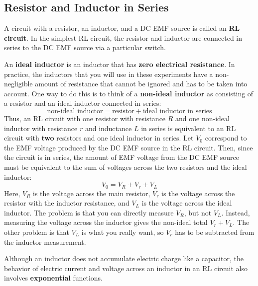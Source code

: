 \subsection{Resistor and Inductor in Series}
%
A circuit with a resistor, an inductor, and a DC EMF source is called an \textbf{RL circuit}. In the simplest RL circuit, the resistor and inductor are connected in series to the DC EMF source via a particular switch.

An \textbf{ideal inductor} is an inductor that has \textbf{zero electrical resistance}. In practice, the inductors that you will use in these experiments have a non-negligible amount of resistance that cannot be ignored and has to be taken into account. One way to do this is to think of a \textbf{non-ideal inductor} as consisting of a resistor and an ideal inductor connected in series:
\begin{equation}
    \text{non-ideal inductor} = \text{resistor} + \text{ideal inductor in series}
\end{equation}
Thus, an RL circuit with one resistor with resistance $R$ and one non-ideal inductor with resistance $r$ and inductance $L$ in series is equivalent to an RL circuit with \textbf{two} resistors and one ideal inductor in series. Let $V_{0}$ correspond to the EMF voltage produced by the DC EMF source in the RL circuit. Then, since the circuit is in series, the amount of EMF voltage from the DC EMF source must be equivalent to the sum of voltages across the two resistors and the ideal inductor:
\begin{equation}
    V_{0} = V_{R} + V_{r} + V_{L}
\end{equation}
Here, $V_{R}$ is the voltage across the main resistor, $V_{r}$ is the voltage across the resistor with the inductor resistance, and $V_{L}$ is the voltage across the ideal inductor. The problem is that you can directly measure $V_{R}$, but not $V_{L}$. Instead, measuring the voltage across the inductor gives the non-ideal total $V_{r} + V_{L}$. The other problem is that $V_{L}$ is what you really want, so $V_{r}$ has to be subtracted from the inductor measurement.

Although an inductor does not accumulate electric charge like a capacitor, the behavior of electric current and voltage across an inductor in an RL circuit also involves \textbf{exponential} functions.

